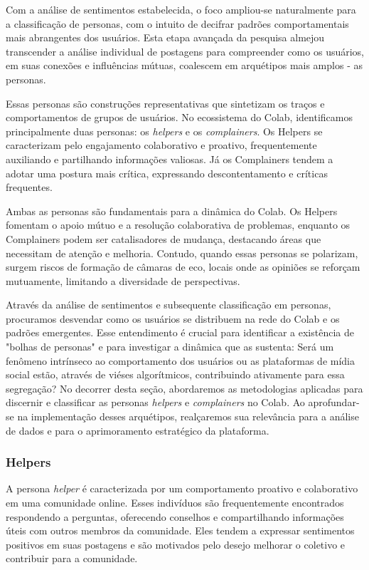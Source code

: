Com a análise de sentimentos estabelecida, o foco ampliou-se naturalmente para a classificação de personas, com o intuito de decifrar padrões comportamentais mais abrangentes dos usuários. Esta etapa avançada da pesquisa almejou transcender a análise individual de postagens para compreender como os usuários, em suas conexões e influências mútuas, coalescem em arquétipos mais amplos - as personas.

Essas personas são construções representativas que sintetizam os traços e comportamentos de grupos de usuários. No ecossistema do Colab, identificamos principalmente duas personas: os \textit{helpers} e os \textit{complainers}. Os Helpers se caracterizam pelo engajamento colaborativo e proativo, frequentemente auxiliando e partilhando informações valiosas. Já os Complainers tendem a adotar uma postura mais crítica, expressando descontentamento e críticas frequentes.

Ambas as personas são fundamentais para a dinâmica do Colab. Os Helpers fomentam o apoio mútuo e a resolução colaborativa de problemas, enquanto os Complainers podem ser catalisadores de mudança, destacando áreas que necessitam de atenção e melhoria. Contudo, quando essas personas se polarizam, surgem riscos de formação de câmaras de eco, locais onde as opiniões se reforçam mutuamente, limitando a diversidade de perspectivas.

Através da análise de sentimentos e subsequente classificação em personas, procuramos desvendar como os usuários se distribuem na rede do Colab e os padrões emergentes. Esse entendimento é crucial para identificar a existência de "bolhas de personas" e para investigar a dinâmica que as sustenta: Será um fenômeno intrínseco ao comportamento dos usuários ou as plataformas de mídia social estão, através de viéses algorítmicos, contribuindo ativamente para essa segregação? No decorrer desta seção, abordaremos as metodologias aplicadas para discernir e classificar as personas \textit{helpers} e \textit{complainers} no Colab. Ao aprofundar-se na implementação desses arquétipos, realçaremos sua relevância para a análise de dados e para o aprimoramento estratégico da plataforma.

\subsubsection*{Helpers}

A persona \textit{helper} é caracterizada por um comportamento proativo e colaborativo em uma comunidade online. Esses indivíduos são frequentemente encontrados respondendo a perguntas, oferecendo conselhos e compartilhando informações úteis com outros membros da comunidade. Eles tendem a expressar sentimentos positivos em suas postagens e são motivados pelo desejo melhorar o coletivo e contribuir para a comunidade.


